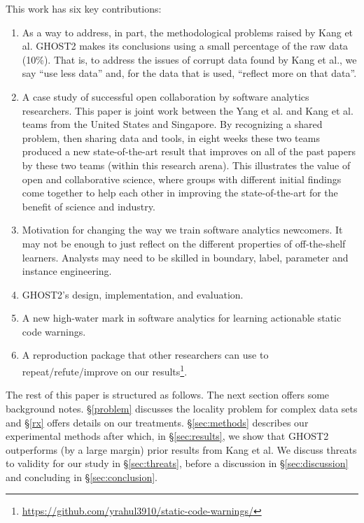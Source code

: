 \documentclass[compsoc,10pt]{IEEEtran}
\newcommand{\be}{\noindent\begin{enumerate}}
\newcommand{\ee}{\noindent\end{enumerate}}
\begin{document}
   
This work has six key contributions:
\be
\item
As a way to address, in part, the methodological problems raised by Kang et al. GHOST2 makes its conclusions using   a small percentage of the raw data (10\%). That is, to address the issues
of corrupt data found by Kang et al., we say ``use less data'' and, for the data that is used,   ``reflect more on that data''.
\item
A case study of successful open collaboration
by software analytics researchers. 
This paper is joint work between the Yang et al. and Kang et al. teams
from the United States and Singapore. By recognizing a shared problem, then sharing  data and tools, in eight weeks these two teams produced a new
state-of-the-art result that improves on all of the past  
papers by these two teams (within this research arena). This illustrates the value of open and collaborative science, where groups with different initial findings come together to help each other in improving the state-of-the-art for the benefit of science and industry.
\item
Motivation for changing the way we train  software analytics newcomers.  It may not be enough to just reflect on the
different properties of off-the-shelf learners.
Analysts may need to be skilled in
boundary, label, parameter and instance engineering.
\item GHOST2's  design, implementation, and evaluation.
\item A new high-water mark in software analytics for learning actionable static code warnings.
\item A reproduction package  that other researchers can use to repeat/refute/improve on our results\footnote{ \url{https://github.com/yrahul3910/static-code-warnings/}}.


\ee
The rest of this paper is structured as follows. The next section offers some background notes. \S \ref{problem} discusses the locality
problem for complex data sets and \S \ref{rx}
offers details on our treatments.  \S \ref{sec:methods} describes our experimental methods
after which, in \S \ref{sec:results}, we show that GHOST2      outperforms (by a large margin) prior results from Kang et al. We discuss threats to validity for our study in \S \ref{sec:threats}, before a discussion in \S \ref{sec:discussion} and concluding in \S \ref{sec:conclusion}.
\end{document}
